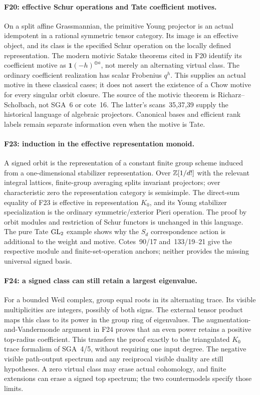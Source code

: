 \documentclass[11pt,a4paper]{article}
\newcommand{\fid}[1]{\textsf{#1}}\newcommand{\gate}[1]{\textsf{#1}}
\theoremstyle{named}\newtheorem{finding}{Finding}[section]
\theoremstyle{definition}\newtheorem{definition}[finding]{Definition}
\theoremstyle{remark}\newtheorem{remark}[finding]{Remark}
\begin{document}
\paragraph{\fid{F20}: effective Schur operations and Tate coefficient motives.}
On a split affine Grassmannian, the primitive Young projector is an
actual idempotent in a rational symmetric tensor category. Its image
is an effective object, and its class is the specified Schur operation
on the locally defined representation. The modern motivic Satake
theorems cited in \fid{F20} identify its coefficient motive as
$\mathbf1(-h)^{\oplus a}$, not merely an alternating virtual class.
The ordinary coefficient realization has scalar Frobenius $q^h$.
This supplies an actual motive in these classical cases; it does not
assert the existence of a Chow motive for every singular orbit closure.
The source of the motivic theorem is Richarz--Scholbach, not SGA~6
or cote~16. The latter's scans~35,37,39 supply the historical language
of algebraic projectors. Canonical bases and efficient rank labels
remain separate information even when the motive is Tate.

\paragraph{\fid{F23}: induction in the effective representation monoid.}
A signed orbit is the representation of a constant finite group
scheme induced from a one-dimensional stabilizer representation.
Over $\mathbb Z[1/d!]$ with the relevant integral lattices, finite-group
averaging splits invariant projectors; over characteristic zero
the representation category is semisimple. The direct-sum equality
of \fid{F23} is effective in representation $K_0$, and its Young
stabilizer specialization is the ordinary symmetric/exterior Pieri
operation. The proof by orbit modules and restriction of Schur
functors is unchanged in this language. The pure Tate $\mathrm{GL}_2$
example shows why the $S_d$ correspondence action is additional to
the weight and motive. Cotes~90/17 and~133/19--21 give the respective
module and finite-set-operation anchors; neither provides the missing
universal signed basis.

\paragraph{\fid{F24}: a signed class can still retain a largest eigenvalue.}
For a bounded Weil complex, group equal roots in its alternating trace.
Its visible multiplicities are integers, possibly of both signs.
The external tensor product maps this class to its power in the
group ring of eigenvalues. The augmentation-and-Vandermonde argument
in \fid{F24} proves that an even power retains a positive top-radius
coefficient. This transfers the proof exactly to the triangulated
$K_0$ trace formalism of SGA~4/5, without requiring one input degree.
The negative visible path-output spectrum and any reciprocal visible
duality are still hypotheses. A zero virtual class may erase actual
cohomology, and finite extensions can erase a signed top spectrum;
the two countermodels specify those limits.
\end{document}
